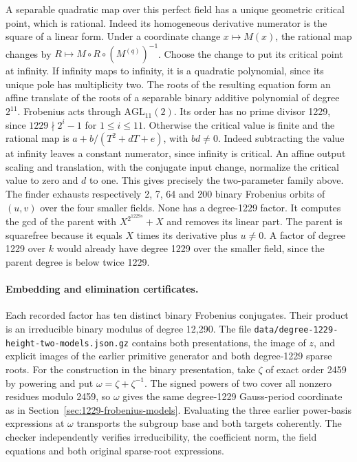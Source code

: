 \documentclass[11pt]{article}
\begin{document}
A separable quadratic map over this perfect field has a unique
geometric critical point, which is rational. Indeed its
homogeneous derivative numerator is the square of a linear form.
Under a coordinate change \(x\mapsto M(x)\), the rational map
changes by \(R\mapsto M\circ R\circ(M^{(q)})^{-1}\).
Choose the change to put its critical point at infinity.
If infinity maps to infinity, it is a quadratic polynomial, since
its unique pole has multiplicity two. The roots of the resulting
equation form an affine translate of the roots of a separable
binary additive polynomial of degree \(2^{11}\). Frobenius acts
through \(\mathrm{AGL}_{11}(2)\). Its order has no prime divisor
1229, since \(1229\nmid 2^i-1\) for \(1\le i\le11\).
Otherwise the critical value is finite and the rational map is
\(a+b/(T^2+dT+e)\), with \(bd\ne0\). Indeed subtracting the
value at infinity leaves a constant numerator, since infinity
is critical. An affine output scaling and translation, with the
conjugate input change, normalize the critical value to zero and
\(d\) to one. This gives precisely the two-parameter family above.
The finder exhausts respectively 2, 7, 64 and 200 binary Frobenius
orbits of \((u,v)\) over the four smaller fields. None has a
degree-1229 factor. It computes the gcd of the parent with
\(X^{2^{1229s}}+X\) and removes its linear part. The parent is
squarefree because it equals \(X\) times its derivative plus
\(u\ne0\). A factor of degree 1229 over \(k\) would already have
degree 1229 over the smaller field, since the parent degree is
below twice 1229.

\paragraph{Embedding and elimination certificates.}
Each recorded factor has ten distinct binary Frobenius conjugates.
Their product is an irreducible binary modulus of degree 12,290.
The file \nolinkurl{data/degree-1229-height-two-models.json.gz}
contains both presentations, the image of \(z\), and explicit images
of the earlier primitive generator and both degree-1229 sparse
roots. For the construction in the binary presentation, take
\(\zeta\) of exact order 2459 by powering and put
\(\omega=\zeta+\zeta^{-1}\).
The signed powers of two cover all nonzero residues modulo 2459,
so \(\omega\) gives the same degree-1229 Gauss-period coordinate
as in Section~\ref{sec:1229-frobenius-models}. Evaluating the
three earlier power-basis expressions at \(\omega\) transports
the subgroup base and both targets coherently. The checker
independently verifies irreducibility, the coefficient norm, the
field equations and both original sparse-root expressions.
\end{document}
